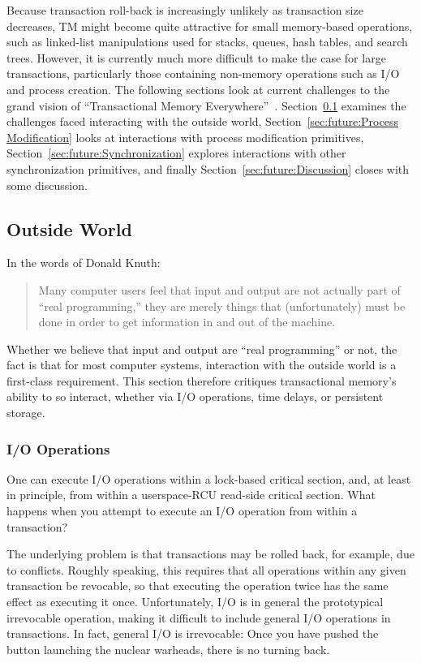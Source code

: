 Because transaction roll-back is increasingly unlikely as transaction
size decreases, TM might become quite attractive for small memory-based
operations,
such as linked-list manipulations used for stacks, queues, hash tables,
and search trees.
However, it is currently much more difficult to make the case for large
transactions, particularly those containing non-memory operations such
as I/O and process creation.
The following sections look at current challenges to the grand vision of
``Transactional Memory Everywhere''~\cite{PaulEMcKenney2009TMeverywhere}.
Section~\ref{sec:future:Outside World} examines the challenges faced
interacting with the outside world,
Section~\ref{sec:future:Process Modification} looks at interactions
with process modification primitives,
Section~\ref{sec:future:Synchronization} explores interactions with
other synchronization primitives, and finally
Section~\ref{sec:future:Discussion} closes with some discussion.

\subsection{Outside World}
\label{sec:future:Outside World}

In the words of Donald Knuth:

\begin{quote}
	Many computer users feel that input and output are not actually part
	of ``real programming,'' they are merely things that (unfortunately)
	must be done in order to get information in and out of the machine.
\end{quote}

Whether we believe that input and output are ``real programming'' or
not, the fact is that for most computer systems, interaction with the
outside world is a first-class requirement.
This section therefore critiques transactional memory's ability to
so interact, whether via I/O operations, time delays, or persistent
storage.

\subsubsection{I/O Operations}
\label{sec:future:I/O Operations}

One can execute I/O operations within a lock-based critical section,
and, at least in principle, from within a userspace-RCU read-side
critical section.
What happens when you attempt to execute an I/O operation from within
a transaction?

The underlying problem is that transactions may be rolled back, for
example, due to conflicts.
Roughly speaking, this requires that all operations within any given
transaction be revocable, so that executing the operation twice has
the same effect as executing it once.
Unfortunately, I/O is in general the prototypical irrevocable
operation, making it difficult to include general I/O operations in
transactions.
In fact, general I/O is irrevocable:
Once you have pushed the button launching the nuclear warheads, there
is no turning back.

